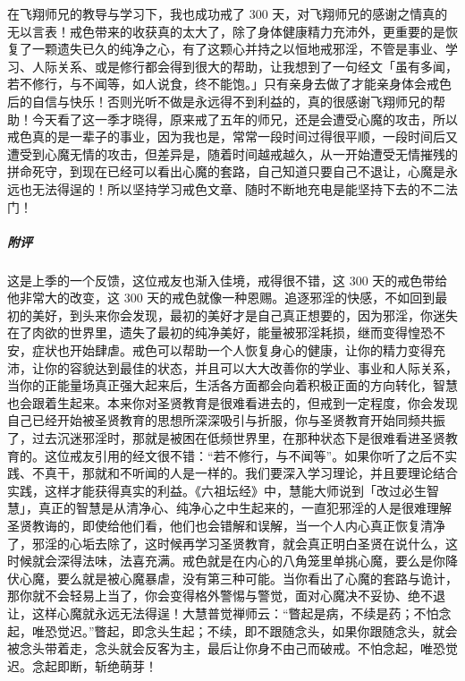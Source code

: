 \begin{case}
    在飞翔师兄的教导与学习下，我也成功戒了 300 天，对飞翔师兄的感谢之情真的无以言表！戒色带来的收获真的太大了，除了身体健康精力充沛外，更重要的是恢复了一颗遗失已久的纯净之心，有了这颗心并持之以恒地戒邪淫，不管是事业、学习、人际关系、或是修行都会得到很大的帮助，让我想到了一句经文「虽有多闻，若不修行，与不闻等，如人说食，终不能饱。」只有亲身去做了才能亲身体会戒色后的自信与快乐！否则光听不做是永远得不到利益的，真的很感谢飞翔师兄的帮助！今天看了这一季才晓得，原来戒了五年的师兄，还是会遭受心魔的攻击，所以戒色真的是一辈子的事业，因为我也是，常常一段时间过得很平顺，一段时间后又遭受到心魔无情的攻击，但差异是，随着时间越戒越久，从一开始遭受无情摧残的拼命死守，到现在已经可以看出心魔的套路，自己知道只要自己不退让，心魔是永远也无法得逞的！所以坚持学习戒色文章、随时不断地充电是能坚持下去的不二法门！
    \subparagraph{附评} 这是上季的一个反馈，这位戒友也渐入佳境，戒得很不错，这 300 天的戒色带给他非常大的改变，这 300 天的戒色就像一种恩赐。追逐邪淫的快感，不如回到最初的美好，到头来你会发现，最初的美好才是自己真正想要的，因为邪淫，你迷失在了肉欲的世界里，遗失了最初的纯净美好，能量被邪淫耗损，继而变得惶恐不安，症状也开始肆虐。戒色可以帮助一个人恢复身心的健康，让你的精力变得充沛，让你的容貌达到最佳的状态，并且可以大大改善你的学业、事业和人际关系，当你的正能量场真正强大起来后，生活各方面都会向着积极正面的方向转化，智慧也会跟着生起来。本来你对圣贤教育是很难看进去的，但戒到一定程度，你会发现自己已经开始被圣贤教育的思想所深深吸引与折服，你与圣贤教育开始同频共振了，过去沉迷邪淫时，那就是被困在低频世界里，在那种状态下是很难看进圣贤教育的。这位戒友引用的经文很不错：“若不修行，与不闻等”。如果你听了之后不实践、不真干，那就和不听闻的人是一样的。我们要深入学习理论，并且要理论结合实践，这样才能获得真实的利益。《六祖坛经》中，慧能大师说到「改过必生智慧」，真正的智慧是从清净心、纯净心之中生起来的，一直犯邪淫的人是很难理解圣贤教诲的，即使给他们看，他们也会错解和误解，当一个人内心真正恢复清净了，邪淫的心垢去除了，这时候再学习圣贤教育，就会真正明白圣贤在说什么，这时候就会深得法味，法喜充满。戒色就是在内心的八角笼里单挑心魔，要么是你降伏心魔，要么就是被心魔暴虐，没有第三种可能。当你看出了心魔的套路与诡计，那你就不会轻易上当了，你会变得格外警惕与警觉，面对心魔决不妥协、绝不退让，这样心魔就永远无法得逞！大慧普觉禅师云：“瞥起是病，不续是药；不怕念起，唯恐觉迟。”瞥起，即念头生起；不续，即不跟随念头，如果你跟随念头，就会被念头带着走，念头就会反客为主，最后让你身不由己而破戒。不怕念起，唯恐觉迟。念起即断，斩绝萌芽！
\end{case}

